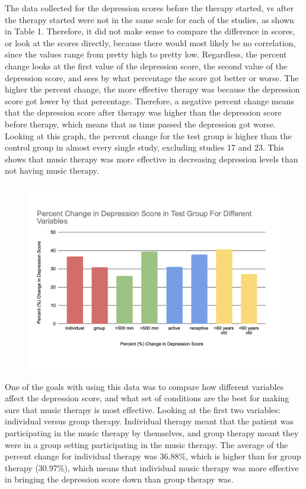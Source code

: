 \documentclass[12pt]{article}
\begin{document}
 The data collected for the depression scores before the therapy started, vs after the therapy started were not in the same scale for each of the studies, as shown in Table 1. Therefore, it did not make sense to compare the difference in scores, or look at the scores directly, because there would most likely be no correlation, since the values range from pretty high to pretty low. Regardless, the percent change looks at the first value of the depression score, the second value of the depression score, and sees by what percentage the score got better or worse. The higher the percent change, the more effective therapy was because the depression score got lower by that percentage. Therefore, a negative percent change means that the depression score after therapy was higher than the depression score before therapy, which means that as time passed the depression got worse. Looking at this graph, the percent change for the test group is higher than the control group in almost every single study, excluding studies 17 and 23. This shows that music therapy was more effective in decreasing depression levels than not having music therapy.

 \begin{figure}[hbt!]
  \centering
  \includegraphics[width=12 cm]{CHART2.png}
  \label{fig:chart2}
\end{figure}

 One of the goals with using this data was to compare how different variables affect the depression score, and what set of conditions are the best for making sure that music therapy is most effective. Looking at the first two variables: individual versus group therapy. Individual therapy meant that the patient was participating in the music therapy by themselves, and group therapy meant they were in a group setting participating in the music therapy. The average of the percent change for individual therapy was 36.88\%, which is higher than for group therapy (30.97\%), which means that individual music therapy was more effective in bringing the depression score down than group therapy was. 
 
\end{document}

